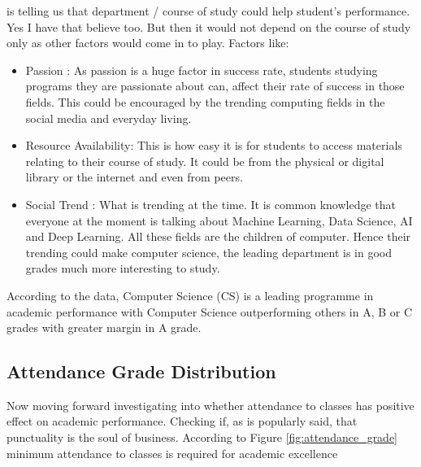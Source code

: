is telling us that department / course of study could help student's performance. Yes I have that believe too. But then it would not depend on the course of study only as other factors would come in to play. Factors like:
\begin{itemize}
	\item Passion :  As passion is a huge factor in success rate, students studying programs they are passionate about can, affect their rate of success in those fields. This could be encouraged by the trending computing fields in the social media and everyday living.
	
	\item Resource Availability: This is how easy it is for students to access materials relating to their course of study. It could be from the physical or digital library or the internet and even from peers. 
	
	\item Social Trend : What is trending at the time. It is common knowledge that everyone at the moment is talking about Machine Learning, Data Science, AI and Deep Learning. All these fields are the children of computer. Hence their trending could make computer science, the leading department is in good grades much more interesting to study. 
\end{itemize}
According to the data, Computer Science (CS) is a leading programme in academic performance with Computer Science outperforming others in A, B or C grades with greater margin in A grade.

\subsection{Attendance Grade Distribution}
Now moving forward investigating into whether attendance to classes has positive effect on academic performance. Checking if, as is popularly said, that punctuality is the soul of business. According to Figure \ref{fig:attendance_grade} minimum attendance to classes is required for academic excellence

